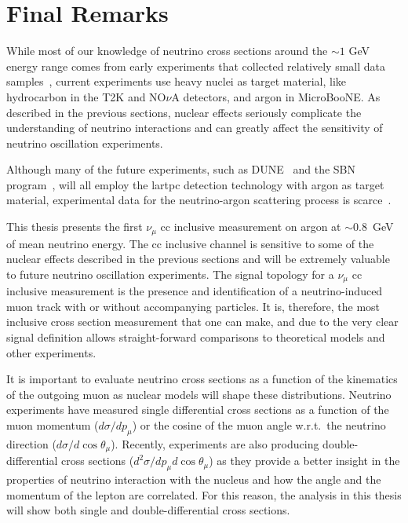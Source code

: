 \section{Final Remarks}
\label{sec:remarks}

While most of our knowledge of neutrino cross sections around the $\sim 1$ GeV energy range comes from early experiments that collected relatively small data samples~\cite{zeller}, current experiments use heavy nuclei as target material, like hydrocarbon in the T2K and NO$\nu$A detectors, and argon in MicroBooNE. As described in the previous sections, nuclear effects seriously complicate the understanding of neutrino interactions and can greatly affect the sensitivity of neutrino oscillation experiments. 

Although many of the future experiments, such as DUNE~\cite{dune1, dune2, dune3} and the SBN program~\cite{sbn}, will all employ the \acrfull{lartpc} detection technology with argon as target material, experimental data for the neutrino-argon scattering process is scarce~\cite{ArgoNeuTCCincl, ArgoNeuTCCincl2}.

This thesis presents the first $\nu_{\mu}$ \acrshort{cc} inclusive measurement on argon at $\sim 0.8$~GeV of mean neutrino energy. The \acrshort{cc} inclusive channel is sensitive to some of the nuclear effects described in the previous sections and will be extremely valuable to future neutrino oscillation experiments. The signal topology for a $\nu_{\mu}$ \acrshort{cc} inclusive measurement is the presence and identification of a neutrino-induced muon track with or without accompanying particles. It is, therefore, the most inclusive cross section measurement that one can make, and due to the very clear signal definition allows straight-forward comparisons to theoretical models and other experiments. 

It is important to evaluate neutrino cross sections as a function of the kinematics of the outgoing muon as nuclear models will shape these distributions. Neutrino experiments have measured single differential cross sections as a function of the muon momentum ($d\sigma/dp_\mu$) or the cosine of the muon angle w.r.t.~the neutrino direction ($d\sigma/d\cos\theta_\mu$). Recently, experiments are also producing double-differential cross sections ($d^2\sigma/dp_\mu d\cos\theta_\mu$) as they provide a better insight in the properties of neutrino interaction with the nucleus and how the angle and the momentum of the lepton are correlated. For this reason, the analysis in this thesis will show both single and double-differential cross sections.

